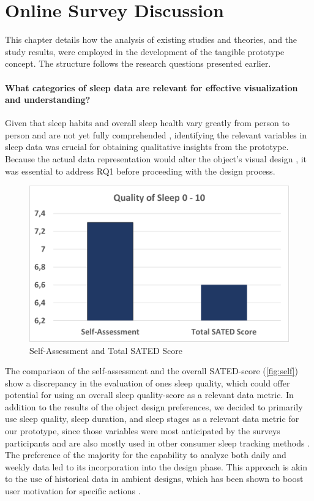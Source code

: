 \documentclass[
  a4paper,  %
  twoside,  %
  bibliography=totoc,
  headsepline,
  cleardoublepage=empty,
  parskip=half,
  draft=false
]{scrbook}
\begin{document}
\section{Online Survey Discussion}
This chapter details how the analysis of existing studies and theories, and the study results, were employed in the development
of the tangible prototype concept. The structure follows the research questions presented earlier.

\paragraph{What categories of sleep data are relevant for effective visualization and understanding?} Given that sleep habits and overall sleep health vary greatly from person to person and are not yet fully comprehended \cite{Define_Sleep_Health}, identifying the relevant variables in sleep data was crucial for obtaining qualitative insights from the prototype. Because the actual data representation would alter the object's visual design \cite{Oppotunieites_Challenges_DataPhysicalization}, it was essential to address RQ1 before proceeding with the design process. 
\begin{figure}[H]
    \centering
    \includegraphics[scale=0.8]{graphics/SATED_vs_Self.png}
    \caption{Self-Assessment and Total SATED Score}
    \label{fig:self}
\end{figure}
The comparison of the self-assessment and the overall SATED-score (\autoref{fig:self}) show a discrepancy in the evaluation of ones sleep quality, which could offer potential for using an overall sleep quality-score as a relevant data metric. In addition to the results of the object design preferences, we decided to primarily use sleep quality, sleep duration, and sleep stages as a relevant data metric for our prototype, since those variables were most anticipated by the surveys participants and are also mostly used in other consumer sleep tracking methods \cite{Consumer_SleepTracking}. The preference of the majority for the capability to analyze both daily and weekly data led to its incorporation into the design phase. This approach is akin to the use of historical data in ambient designs, which has been shown to boost user motivation for specific actions \cite{rodriguez_cammina_2013}.
\end{document}
